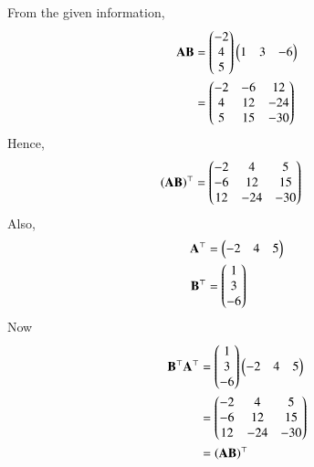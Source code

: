From the given information,     
\begin{align}    
    \mathbf{AB} &= \begin{pmatrix}-2\\4\\5\end{pmatrix}\begin{pmatrix}1&3&-6\end{pmatrix}\\
 &= \begin{pmatrix}-2&-6&12\\4&12&-24\\5&15&-30\end{pmatrix}
\end{align}
Hence, 
\begin{align}
\left(\mathbf{AB}\right)^{\top} &=  \begin{pmatrix}-2&4&5\\-6&12&15\\12&-24&-30\end{pmatrix}
\end{align}
Also,
\begin{align}
\mathbf{A}^{\top} &= \begin{pmatrix}-2&4&5\end{pmatrix} \\
\mathbf{B}^{\top} &= \begin{pmatrix}1\\3\\-6\end{pmatrix}
\end{align}
Now
\begin{align}
\mathbf{B}^{\top}\mathbf{A}^{\top} &= \begin{pmatrix}1\\3\\-6\end{pmatrix}\begin{pmatrix}-2&4&5\end{pmatrix}\\
&= \begin{pmatrix}-2&4&5\\-6&12&15\\12&-24&-30\end{pmatrix}\\
 &= \left(\mathbf{AB}\right)^{\top} 
\end{align}

